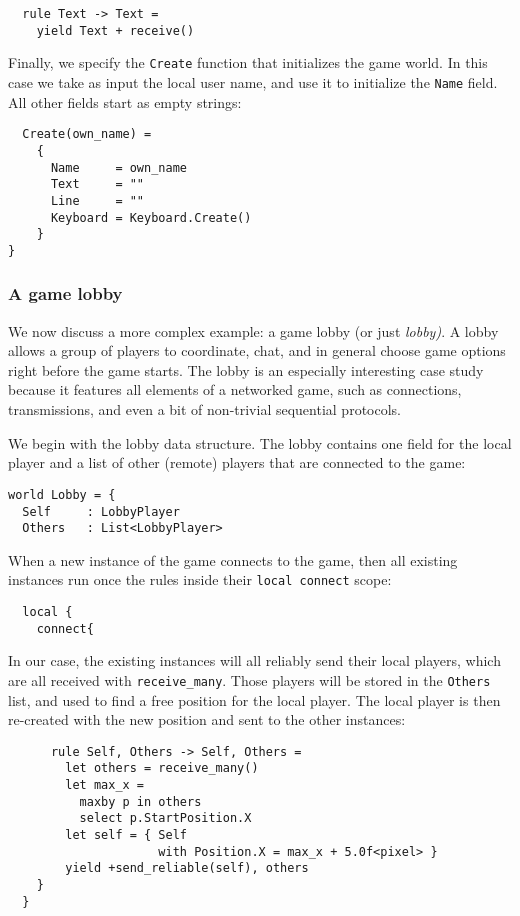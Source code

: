 \begin{lstlisting}
  rule Text -> Text =
    yield Text + receive()
\end{lstlisting}

Finally, we specify the \texttt{Create} function that initializes the game world. In this case we take as input the local user name, and use it to initialize the \texttt{Name} field. All other fields start as empty strings:

\begin{lstlisting}
  Create(own_name) = 
    {
      Name     = own_name
      Text     = ""
      Line     = ""
      Keyboard = Keyboard.Create()
    }
}
\end{lstlisting}

\subsubsection{A game lobby}
We now discuss a more complex example: a game lobby (or just \textit{lobby)}. A lobby allows a group of players to coordinate, chat, and in general choose game options right before the game starts. The lobby is an especially interesting case study because it features all elements of a networked game, such as connections, transmissions, and even a bit of non-trivial sequential protocols.

We begin with the lobby data structure. The lobby contains one field for the local player and a list of other (remote) players that are connected to the game:

\begin{lstlisting}
world Lobby = {
  Self     : LobbyPlayer
  Others   : List<LobbyPlayer>
\end{lstlisting}

When a new instance of the game connects to the game, then all existing instances run once the rules inside their \texttt{local connect} scope:

\begin{lstlisting}
  local {
    connect{
\end{lstlisting}

In our case, the existing instances will all reliably send their local players, which are all received with \texttt{receive\_many}. Those players will be stored in the \texttt{Others} list, and used to find a free position for the local player. The local player is then re-created with the new position and sent to the other instances:

\begin{lstlisting}
      rule Self, Others -> Self, Others =
        let others = receive_many()
        let max_x = 
          maxby p in others
          select p.StartPosition.X
        let self = { Self 
                     with Position.X = max_x + 5.0f<pixel> }
        yield +send_reliable(self), others
    }
  }
\end{lstlisting}

